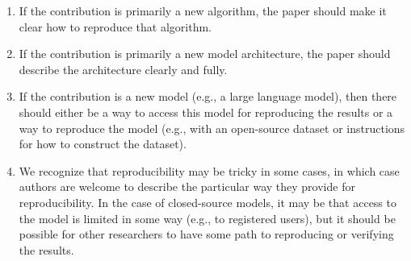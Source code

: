 \begin{enumerate}
\begin{itemize}
        \begin{enumerate}
            \item If the contribution is primarily a new algorithm, the paper should make it clear how to reproduce that algorithm.
            \item If the contribution is primarily a new model architecture, the paper should describe the architecture clearly and fully.
            \item If the contribution is a new model (e.g., a large language model), then there should either be a way to access this model for reproducing the results or a way to reproduce the model (e.g., with an open-source dataset or instructions for how to construct the dataset).
            \item We recognize that reproducibility may be tricky in some cases, in which case authors are welcome to describe the particular way they provide for reproducibility. In the case of closed-source models, it may be that access to the model is limited in some way (e.g., to registered users), but it should be possible for other researchers to have some path to reproducing or verifying the results.
        \end{enumerate}
    \end{itemize}


\end{enumerate}
